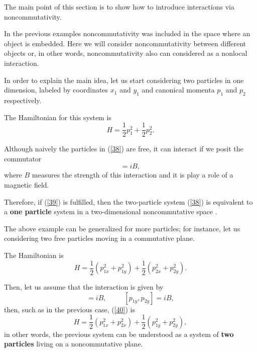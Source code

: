 \documentclass[a4paper,aps,twocolumn,amsfonts]{revtex4}
\begin{document}
   The main point of this section is to show how to introduce interactions via noncommutativity.

   In the previous examples noncommutativity was included in the space where an object is embedded. Here we will consider noncommutativity between different objects or,  in other words, noncommutativity also can considered as a nonlocal interaction.

   In order to explain the main idea, let us start  considering two particles in one dimension, labeled by coordinates $x_1$ and $y_1$ and canonical momenta $p_1$ and $p_2$ respectively.

   The Hamiltonian for this system is
   \begin{equation}
   H=\frac{1}{2}p_1^2 + \frac{1}{2}p_2^2.
   \label{38}
   \end{equation}


   Although naively the particles in (\ref{38}) are free, it can interact if we posit the commutator
   \begin{equation}
   [p_1,p_2]=iB, 
   \label{39}
   \end{equation}
   where  $B$ measures the strength of this interaction and it is play a role of a magnetic field.

   Therefore, if (\ref{39}) is fulfilled, then the two-particle system (\ref{38}) is equivalent to a {\bf one particle} system in a two-dimensional noncommutative space \cite{gamboa1}.

   The above example can be generalized for more particles; for instance, let us considering two free particles moving in a commutative plane.

   The Hamiltonian  is
   \begin{equation}
   H=\frac{1}{2}(p_{1x}^2+p_{1y}^2)+\frac{1}{2}(p_{2x}^2+p_{2y}^2).
   \end{equation}

   Then, let us assume that the interaction is given by
    \begin{equation}
    [p_{1x},p_{2x}]=iB,\,\,\,\,\,\,\,\,\,\,\,\,\,\,\,[p_{1y},p_{2y}]=iB,
   \label{40}
    \end{equation}
    then, such as in the previous case,  (\ref{40}) is
   \begin{equation}
   H=\frac{1}{2}(p_{1x}^2+ p_{2x}^2)+\frac{1}{2}(p_{1y}^2+ p_{2y}^2),
   \label{41}
   \end{equation} 
   in other words, the previous system can be understood as a system of {\bf two particles} living on a noncommutative plane.
\end{document}
